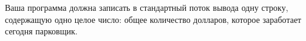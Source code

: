 Ваша программа должна записать в стандартный поток вывода одну строку, содержащую одно
целое число: общее количество долларов, которое заработает сегодня парковщик.